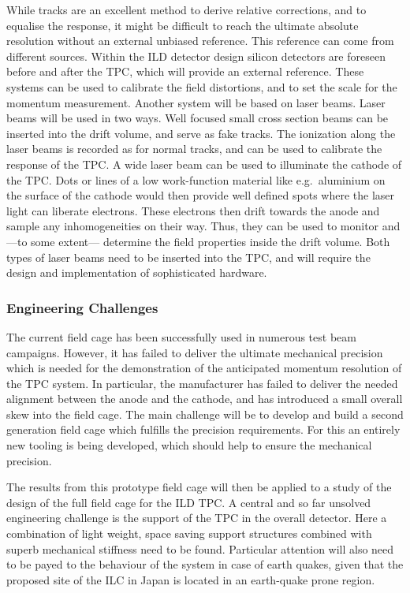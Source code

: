 While tracks are an excellent method to derive relative corrections, and to equalise the response, it might be difficult to reach the ultimate absolute resolution without an external unbiased reference. This reference can come from different sources. Within the ILD detector design silicon detectors are foreseen before and after the TPC, which will provide an external reference. These systems can be used to calibrate the field distortions, and to set the scale for the momentum measurement. Another system will be based on laser beams. Laser beams will be used in two ways. Well focused small cross section beams can be inserted into the drift volume, and serve as fake tracks. The ionization along the laser beams is recorded as for normal tracks, and can be used to calibrate the response of the TPC. A wide laser beam can be used to illuminate the cathode of the TPC. Dots or lines of a low work-function material like e.g.~aluminium on the surface of the cathode would then provide well defined spots where the laser
light can liberate electrons. These electrons then drift towards the anode and sample any inhomogeneities on their way. Thus, they can be used to monitor and ---to some extent--- determine the field properties inside the drift volume. Both types of laser beams need to be inserted into the TPC, and will require the design and implementation of sophisticated hardware.

\subsubsection{Engineering Challenges}
The current field cage has been successfully used in numerous test beam campaigns. However, it has failed to deliver the ultimate mechanical precision which is needed for the demonstration of the anticipated momentum resolution of the TPC system. In particular, the manufacturer has failed to deliver the needed alignment between the anode and the cathode, and has introduced a small overall skew into the field cage. The main challenge will be to develop and build a second generation field cage which fulfills the precision requirements. For this an entirely new tooling is being developed, which should help to ensure the mechanical precision.

The results from this prototype field cage will then be applied to a study of the design of the full field cage for the ILD TPC. A central and so far unsolved engineering challenge is the support of the TPC in the overall detector. Here a combination of light weight, space saving support structures combined with superb mechanical stiffness need to be found. Particular attention will also need to be payed to the behaviour of the system in case of earth quakes, given that the proposed site of the ILC in Japan is located in an earth-quake prone region.

